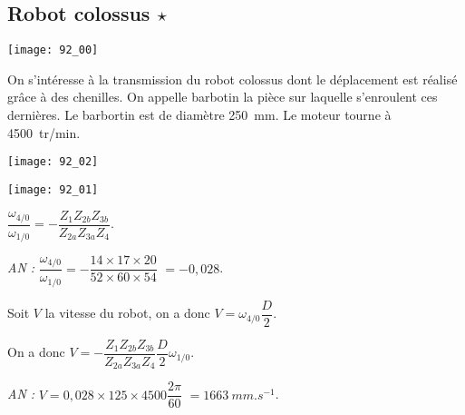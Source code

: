 \normaltrue \difficilefalse \tdifficilefalse
\correctionfalse


\subsection*{Robot colossus $\star$ \label{CIN:03:C2:06:92}}
\setcounter{question}{0}


\ifcorrection
\else
{}
\fi

\ifprof
\else


\begin{marginfigure}
\texttt{[image: 92\_00]}
\end{marginfigure}
On s'intéresse à la transmission du robot colossus dont le déplacement est réalisé grâce à des chenilles. On appelle barbotin la pièce sur laquelle s'enroulent ces dernières. Le barbortin est de diamètre \SI{250}{mm}.
Le moteur tourne à \SI{4500}{tr/min}.

\begin{marginfigure}
\texttt{[image: 92\_02]}
\end{marginfigure}

\begin{marginfigure}
\texttt{[image: 92\_01]}
\end{marginfigure}


\fi




\ifprof
\begin{corrige}
$\dfrac{\omega_{4/0}}{\omega_{1/0}}  = - \dfrac{Z_1 Z_{2b}Z_{3b}}{Z_{2a}Z_{3a}Z_{4}}$.

\textit{AN :} $\dfrac{\omega_{4/0}}{\omega_{1/0}}  = - \dfrac{14\times  17 \times 20}{52 \times 60 \times 54}$ $= - 0,028$.
\end{corrige}
\else
\fi




\ifprof
\begin{corrige}
Soit $V$ la vitesse du robot, on a donc $V = \omega_{4/0} \dfrac{D}{2}$.

On a donc $V = - \dfrac{Z_1 Z_{2b}Z_{3b}}{Z_{2a}Z_{3a}Z_{4}}  \dfrac{D}{2} \omega_{1/0}$.

\textit{AN :} $V = 0,028 \times 125 \times 4500\dfrac{2\pi}{60}$ $=\SI{1663}{mm.s^{-1}}$. 
\end{corrige}
\else
\fi





\ifprof
\else


\fi